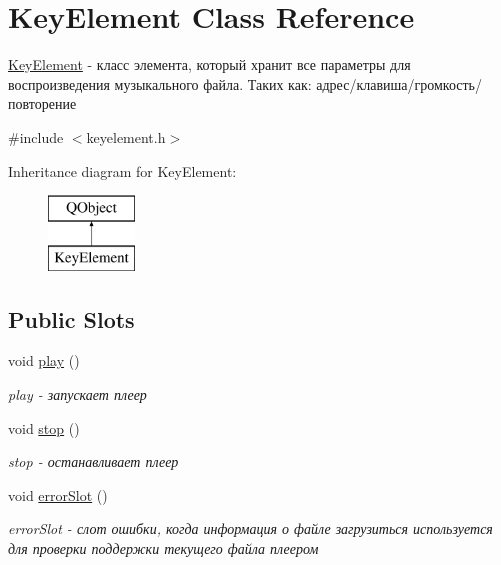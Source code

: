 \hypertarget{class_key_element}{}\section{Key\+Element Class Reference}
\label{class_key_element}


\hyperlink{class_key_element}{Key\+Element} -\/ класс элемента, который хранит все параметры для воспроизведения музыкального файла. Таких как\+: адрес/клавиша/громкость/повторение  




{\ttfamily \#include $<$keyelement.\+h$>$}

Inheritance diagram for Key\+Element\+:\begin{figure}[H]
\begin{center}
\leavevmode
\includegraphics[height=2.000000cm]{class_key_element}
\end{center}
\end{figure}
\subsection*{Public Slots}
\begin{DoxyCompactItemize}
\item 
\mbox{\label{class_key_element_aaaf9e68dd1d0456ba75b107542576161}} 
void \hyperlink{class_key_element_aaaf9e68dd1d0456ba75b107542576161}{play} ()
\begin{DoxyCompactList}\small\item\em play -\/ запускает плеер \end{DoxyCompactList}\item 
\mbox{\label{class_key_element_abeb24994e811465ee0e9ebd57bb83d18}} 
void \hyperlink{class_key_element_abeb24994e811465ee0e9ebd57bb83d18}{stop} ()
\begin{DoxyCompactList}\small\item\em stop -\/ останавливает плеер \end{DoxyCompactList}\item 
\mbox{\label{class_key_element_a24e2928e97f101790f4f0c9bdfeced4c}} 
void \hyperlink{class_key_element_a24e2928e97f101790f4f0c9bdfeced4c}{error\+Slot} ()
\begin{DoxyCompactList}\small\item\em error\+Slot -\/ слот ошибки, когда информация о файле загрузиться используется для проверки поддержки текущего файла плеером \end{DoxyCompactList}\end{DoxyCompactItemize}
